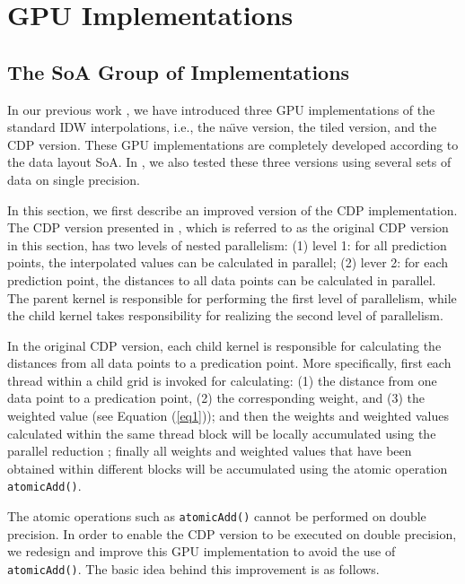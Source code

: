 \section{GPU Implementations}
\label{sec:implement}

\subsection{The SoA Group of Implementations}
\label{sec:implement:soa}

In our previous work \cite{mei2014}, we have introduced three GPU implementations 
of the standard IDW interpolations, i.e., the na\"{\i}ve version, the tiled 
version, and the CDP version. These GPU implementations are completely 
developed according to the data layout SoA. In \cite{mei2014}, we also tested these 
three versions using several sets of data on single precision. 

In this section, we first describe an improved version of the CDP 
implementation. The CDP version presented in \cite{mei2014}, which is referred to 
as the original CDP version in this section, has two levels of nested 
parallelism: (1) level 1: for all prediction points, the interpolated values 
can be calculated in parallel; (2) lever 2: for each prediction point, the 
distances to all data points can be calculated in parallel. The parent 
kernel is responsible for performing the first level of parallelism, while 
the child kernel takes responsibility for realizing the second level of 
parallelism.

In the original CDP version, each child kernel is responsible for 
calculating the distances from all data points to a predication point. More 
specifically, first each thread within a child grid is invoked for 
calculating: (1) the distance from one data point to a predication point, 
(2) the corresponding weight, and (3) the weighted value (see Equation (\ref{eq1})); 
and then the weights and weighted values calculated within the same thread 
block will be locally accumulated using the parallel reduction \cite{harris2007}; 
finally all weights and weighted values that have been obtained within 
different blocks will be accumulated using the atomic operation \texttt{atomicAdd()}.

The atomic operations such as \texttt{atomicAdd()} cannot be performed on double 
precision. In order to enable the CDP version to be executed on double 
precision, we redesign and improve this GPU implementation to avoid the use of 
\texttt{atomicAdd()}. The basic idea behind this improvement is as follows.

